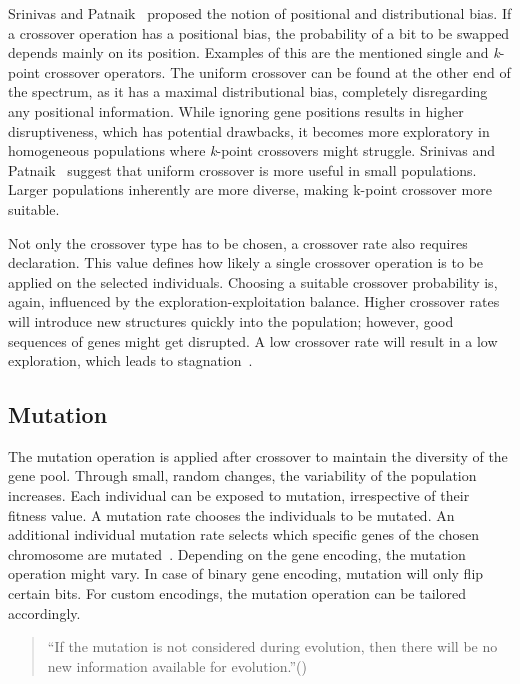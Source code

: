 Srinivas and Patnaik~\cite{srinivas_genetic_1994} proposed the notion of positional and distributional bias. If a crossover operation has a positional bias, the probability of a bit to be swapped depends mainly on its position. Examples of this are the mentioned single and \textit{k}-point crossover operators. The uniform crossover can be found at the other end of the spectrum, as it has a maximal distributional bias, completely disregarding any positional information. While ignoring gene positions results in higher disruptiveness, which has potential drawbacks, it becomes more exploratory in homogeneous populations where \textit{k}-point crossovers might struggle. Srinivas and Patnaik~\cite{srinivas_genetic_1994} suggest that uniform crossover is more useful in small populations. Larger populations inherently are more diverse, making k-point crossover more suitable.

Not only the crossover type has to be chosen, a crossover rate also requires declaration. This value defines how likely a single crossover operation is to be applied on the selected individuals. Choosing a suitable crossover probability is, again, influenced by the exploration-exploitation balance. Higher crossover rates will introduce new structures quickly into the population; however, good sequences of genes might get disrupted. A low crossover rate will result in a low exploration, which leads to stagnation~\cite{grefenstette_optimization_1986}.

\subsection{Mutation}
The mutation operation is applied after crossover to maintain the diversity of the gene pool. Through small, random changes, the variability of the population increases. Each individual can be exposed to mutation, irrespective of their fitness value. A mutation rate chooses the individuals to be mutated. An additional individual mutation rate selects which specific genes of the chosen chromosome are mutated~\cite{srinivas_genetic_1994}. Depending on the gene encoding, the mutation operation might vary. In case of binary gene encoding, mutation will only flip certain bits. For custom encodings, the mutation operation can be tailored accordingly.

\begin{quote}
	\begin{em}
		\enquote{If the mutation is not considered during evolution, then there will be no new information available for evolution.}(\cite{katoch_review_2021})
	\end{em}
\end{quote}

